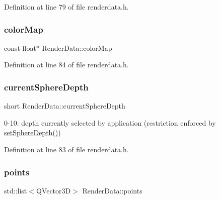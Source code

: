 Definition at line 79 of file renderdata.\+h.

\mbox{\label{class_render_data_a78b66cb01444d2d36c3ed9179705a716}} 
\subsubsection{\texorpdfstring{color\+Map}{colorMap}}
{\footnotesize\ttfamily const float$\ast$ Render\+Data\+::color\+Map\hspace{0.3cm}{\ttfamily [private]}}



Definition at line 84 of file renderdata.\+h.

\mbox{\label{class_render_data_addeb27eb3a3e9c8bf50a3615fbcc8752}} 
\subsubsection{\texorpdfstring{current\+Sphere\+Depth}{currentSphereDepth}}
{\footnotesize\ttfamily short Render\+Data\+::current\+Sphere\+Depth\hspace{0.3cm}{\ttfamily [private]}}



0-\/10\+: depth currently selected by application (restriction enforced by \hyperlink{class_render_data_a8d5f7285d29dc9ca0f93fcf2b5826283}{set\+Sphere\+Depth()}) 



Definition at line 83 of file renderdata.\+h.

\mbox{\label{class_render_data_aaab890b2c9bac7bb08d5f257e98a7cb9}} 
\subsubsection{\texorpdfstring{points}{points}}
{\footnotesize\ttfamily std\+::list$<$Q\+Vector3D$>$ Render\+Data\+::points\hspace{0.3cm}{\ttfamily [private]}}



